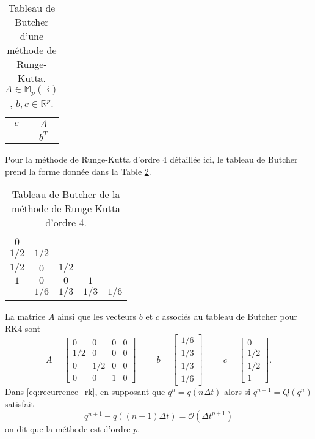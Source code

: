 \begin{table}[htbp]
\begin{center}
\begin{tabular}{c|c}
$c$ & $A$ \\
\hline
    & $b^T$
\end{tabular}
\end{center}
\caption{Tableau de Butcher d'une méthode de Runge-Kutta. $A \in \mathbb{M}_p(\mathbb{R})$, $b,c \in \mathbb{R}^p$.}
\label{tab:butcher}
\end{table}
Pour la méthode de Runge-Kutta d'ordre 4 détaillée ici, le tableau de Butcher prend la forme donnée dans la Table \ref{tab:butcher_rk4}.
\begin{table}[htbp]
\begin{center}
\begin{tabular}{c|cccc}
$0$   &       &      &      &      \\
$1/2$ & $1/2$ &      &      &      \\
$1/2$ & $0$   & $1/2$&      &      \\
$1$   & $0$   & $0$  & $1$  &      \\  
\hline
      & $1/6$ & $1/3$& $1/3$& $1/6$\\
\end{tabular}
\end{center}
\caption{Tableau de Butcher de la méthode de Runge Kutta d'ordre 4.}
\label{tab:butcher_rk4}
\end{table}
La matrice $A$ ainsi que les vecteurs $b$ et $c$ associés au tableau de Butcher pour RK4 sont
\begin{equation}
A= \begin{bmatrix}
0 & 0 & 0 & 0 \\
1/2& 0& 0 & 0 \\
0 &1/2& 0 & 0 \\
0 & 0 & 1 & 0
\end{bmatrix}
\hspace{1cm}
b=\begin{bmatrix}
1/6\\1/3\\1/3\\1/6
\end{bmatrix}
\hspace{1cm}
c=\begin{bmatrix}
0\\1/2\\1/2\\1
\end{bmatrix}.
\end{equation}
Dans \eqref{eq:recurrence_rk}, en supposant que $q^n = q(n \Delta t)$ alors si $q^{n+1}=Q(q^n)$ satisfait 
\begin{equation}
q^{n+1} - q((n+1) \Delta t) = \mathcal{O}(\Delta t^{p+1})
\end{equation}
on dit que la méthode est d'ordre $p$.

